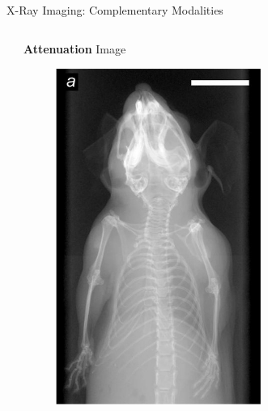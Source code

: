 \documentclass[
 ]{beamer}%
\begin{document}
\begin{frame}{X-Ray Imaging: Complementary Modalities}
    \vspace{0.2cm}
    \begin{columns}
        \begin{column}{0.0\textwidth}
            
        \end{column}
        \begin{column}{.315\textwidth}
            \textbf{Attenuation} Image
            \begin{figure}[ht]
                \centering
                \includegraphics[width=0.63\textwidth]{images/XRay_Attenuation_Contrast.jpg}
                

\end{figure}
\end{column}
\end{columns}
\end{frame}
\end{document}
